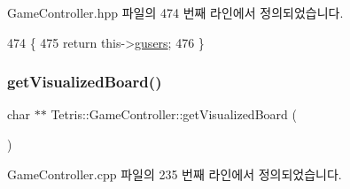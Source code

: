 Game\+Controller.\+hpp 파일의 474 번째 라인에서 정의되었습니다.


\begin{DoxyCode}
474                                          \{
475             \textcolor{keywordflow}{return} this->\hyperlink{class_tetris_1_1_game_controller_a1a31d3a933daad6d95e20458eea2900e}{gusers};
476         \}
\end{DoxyCode}
\mbox{\label{class_tetris_1_1_game_controller_a78b39bdb39707e119d6e708bdb2aca17}} 
\subsubsection{\texorpdfstring{get\+Visualized\+Board()}{getVisualizedBoard()}\hspace{0.1cm}{\footnotesize\ttfamily [1/2]}}
{\footnotesize\ttfamily char $\ast$$\ast$ Tetris\+::\+Game\+Controller\+::get\+Visualized\+Board (\begin{DoxyParamCaption}{ }\end{DoxyParamCaption})}



Game\+Controller.\+cpp 파일의 235 번째 라인에서 정의되었습니다.


